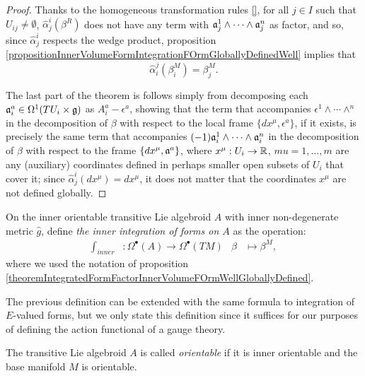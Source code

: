\begin{proof}
Thanks to the homogeneous transformation rules \ref{}, for all $j \in I$ such that $U_{ij} \neq \emptyset$, $\hat \alpha^i_j(\beta^R)$ does not have any term with $\mathfrak{a}_j^1 \wedge \cdots \wedge \mathfrak{a}_j^n$ as factor, and so, since $\hat \alpha^i_j$ respects the wedge product, proposition \ref{propositionInnerVolumeFormIntegrationFOrmGloballyDefinedWell} implies that
\begin{equation}
    \hat \alpha^j_i(\beta^{M}_i) = \beta^{M}_j.
\end{equation}

The last part of the theorem is follows simply from decomposing each $\mathfrak{a}_i^a \in \Omega^1(TU_i \times \mathfrak{g})$ as $A_i^a - \epsilon^a$, showing that the term that accompanies $\epsilon^1 \wedge \cdots \wedge^n$ in the decomposition of $\beta$ with respect to the local frame $\{dx^\mu, \epsilon^a\}$, if it exists, is precisely the same term that accompanies $(-1)\mathfrak{a}_i^1 \wedge \cdots \wedge \mathfrak{a}_i^n$ in the decomposition of $\beta$ with respect to the frame $\{dx^\mu, \mathfrak{a}^a\}$, where $x^\mu: U_i\to \mathbb{R}$, $mu = 1, \dots , m$ are any (auxiliary) coordinates defined in perhaps smaller open subsets of $U_i$ that cover it; since $\hat \alpha^i_j(dx^\mu) = dx^\mu$, it does not matter that the coordinates $x^\mu$ are not defined globally.
\end{proof}


\begin{definition}\label{definitionInnerIntegration}
On the inner orientable transitive Lie algebroid $A$ with inner non-degenerate metric $\hat g$, define \emph{the inner integration of forms on $A$} as the operation:
\begin{align}
    \int_{inner} &: \Omega^\bullet(A) \to \Omega^\bullet(TM)
    & \beta &\mapsto \beta^M,
\end{align}
where we used the notation of proposition \ref{theoremIntegratedFormFactorInnerVolumeFOrmWellGloballyDefined}.
\end{definition}
The previous definition can be extended with the same formula to integration of $E$-valued forms, but we only state this definition since it suffices for our purposes of defining the action functional of a gauge theory.

\begin{definition}
The transitive Lie algebroid $A$ is called \emph{orientable} if it is inner orientable and the base manifold $M$ is orientable.
\end{definition}

